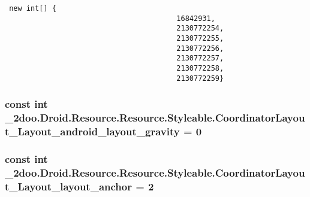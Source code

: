 \begin{Code}\begin{verbatim} new int[] {
                                        16842931,
                                        2130772254,
                                        2130772255,
                                        2130772256,
                                        2130772257,
                                        2130772258,
                                        2130772259}
\end{verbatim}
\end{Code}
\hypertarget{class__2doo_1_1_droid_1_1_resource_1_1_styleable_e60ac90f80817ae0b33b64cdf9af5671}{
\subsubsection[{CoordinatorLayout\_\-Layout\_\-android\_\-layout\_\-gravity}]{\setlength{\rightskip}{0pt plus 5cm}const int \_\-2doo.Droid.Resource.Resource.Styleable.CoordinatorLayout\_\-Layout\_\-android\_\-layout\_\-gravity = 0}}
\label{class__2doo_1_1_droid_1_1_resource_1_1_styleable_e60ac90f80817ae0b33b64cdf9af5671}


\hypertarget{class__2doo_1_1_droid_1_1_resource_1_1_styleable_f6b7bb0c2025c29bd3bb9677769d9acc}{
\subsubsection[{CoordinatorLayout\_\-Layout\_\-layout\_\-anchor}]{\setlength{\rightskip}{0pt plus 5cm}const int \_\-2doo.Droid.Resource.Resource.Styleable.CoordinatorLayout\_\-Layout\_\-layout\_\-anchor = 2}}
\label{class__2doo_1_1_droid_1_1_resource_1_1_styleable_f6b7bb0c2025c29bd3bb9677769d9acc}


